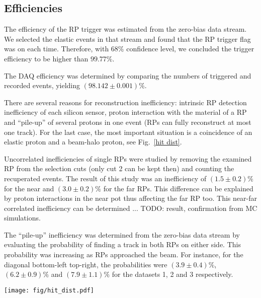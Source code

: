 \documentclass[doublecol]{../macros/epl2}
\def\un#1{\,{\rm #1}}
\begin{document}
\subsection{Efficiencies}

The efficiency of the RP trigger was estimated from the zero-bias data stream. We selected the elastic events in that stream and found that the RP trigger flag was on each time. Therefore, with $68\%$ confidence level, we concluded the trigger efficiency to be higher than $99.77\%$.

The DAQ efficiency was determined by comparing the numbers of triggered and recorded events, yielding $(98.142 \pm 0.001)\%$.

There are several reasons for reconstruction inefficiency: intrinsic RP detection inefficiency of each silicon sensor, proton interaction with the material of a RP and ``pile-up'' of several protons in one event (RPs can fully reconstruct at most one track). For the last case, the most important situation is a coincidence of an elastic proton and a beam-halo proton, see Fig.~\ref{hit dist}.

Uncorrelated inefficiencies of single RPs were studied by removing the examined RP from the selection cuts (only cut 2 can be kept then) and counting the recuperated events. The result of this study was an inefficiency of $(1.5 \pm 0.2)\%$ for the near and $(3.0 \pm 0.2)\%$ for the far RPs. This difference can be explained by proton interactions in the near pot thus affecting the far RP too. This near-far correlated inefficiency can be determined ... TODO: result, confirmation from MC simulations.

The ``pile-up'' inefficiency was determined from the zero-bias data stream by evaluating the probability of finding a track in both RPs on either side. This probability was increasing as RPs approached the beam. For instance, for the diagonal bottom-left top-right, the probabilities were $(3.9 \pm 0.4)\%$, $(6.2 \pm 0.9)\%$ and $(7.9 \pm 1.1)\%$ for the datasets 1, 2 and 3 respectively.


\begin{figure*}
\begin{center}
\texttt{[image: fig/hit\_dist.pdf]}
\vskip-5mm
\caption{Hit distributions from dataset 3 in the far unit of the $220\un{m}$ station, right arm. Left: with diagonal cut only, Right: with all the elastic selection cuts (see Tab.~\ref{cuts}). The left plot clearly indicates the presence of the beam halo, which is eliminated by the selection cuts (the right plot). The distribution of elastic hits in right plot is sharply cut at about $|y| = 29\un{mm}$ which is a consequence of the LHC aperture limitations. }
\label{hit dist}
\end{center}
\end{figure*}
\end{document}
